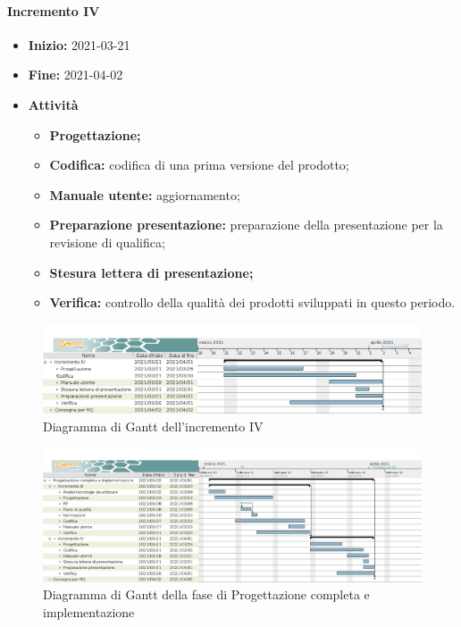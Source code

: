 \paragraph[Incremento IV]{Incremento IV}
\begin{itemize}
    \item [] \textbf{Inizio:} 2021-03-21
    \item [] \textbf{Fine:} 2021-04-02
    \item [] \textbf{Attività}
          \begin{itemize}
              \item \textbf{Progettazione;}
              \item \textbf{Codifica:} codifica di una prima versione del prodotto;
              \item \textbf{Manuale utente:} aggiornamento;
              \item \textbf{Preparazione presentazione:} preparazione della presentazione per la revisione di qualifica;
              \item \textbf{Stesura lettera di presentazione;}
              \item \textbf{Verifica:} controllo della qualità dei prodotti sviluppati in questo periodo.
          \end{itemize}
\end{itemize}

\begin{figure}[H]
    \centering
    \includegraphics[width=1\linewidth]{res/images/pianificazione/incremento_4.png}
    \caption{Diagramma di Gantt dell'incremento IV}
    \label{fig:_Gantt incremento IV}
\end{figure}

\begin{figure}[H]
    \centering
    \includegraphics[width=1\linewidth]{res/images/pianificazione/progettazione_completa_e_implementazione.png}
    \caption{Diagramma di Gantt della fase di Progettazione completa e implementazione}
    \label{fig:_Gantt progettazione completa e implementazione}
\end{figure}

